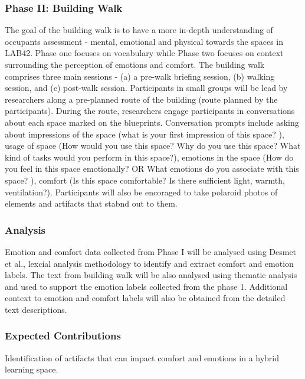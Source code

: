 \documentclass[acmconf, anonymous, review]{acmart}
\begin{document}
\subsubsection{Phase II: Building Walk}
The goal of the building walk is to have a more in-depth understanding of occupants assessment - mental, emotional and physical towards the spaces in LAB42. Phase one focuses on vocabulary while Phase two focuses on context surrounding the perception of emotions and comfort. The building walk comprises three main sessions - (a) a pre-walk briefing session, (b) walking session, and (c) post-walk session. Participants in small groups will be lead by researchers along a pre-planned route of the building (route planned by the participants). During the route, researchers engage participants in conversations about each space marked on the blueprints. Conversation  prompts include asking about impressions of the space (what is your first impression of this space? ), usage of space (How would you use this space? Why do you use this space? What kind of tasks would you perform in this space?), emotions in the space (How do you feel in this space emotionally? OR What emotions do you associate with this space? ), comfort (Is this space comfortable?	Is there sufficient light, warmth, ventilation?). Participants will also be encoraged to take polaroid photos of elements and artifacts that stabnd out to them. 

\subsubsection{Analysis}
Emotion and comfort data collected from Phase I will be analysed using Desmet et al., lexcial analysis methodology to identify and extract comfort and emotion labels. The text from building walk will be also analysed using thematic analysis and used to support the emotion labels collected from the phase 1. Additional context to emotion and comfort labels will also be obtained from the detailed text descriptions.

\subsubsection{Expected Contributions}
Identification of artifacts that can impact comfort and emotions in a hybrid learning space. 

\end{document}
